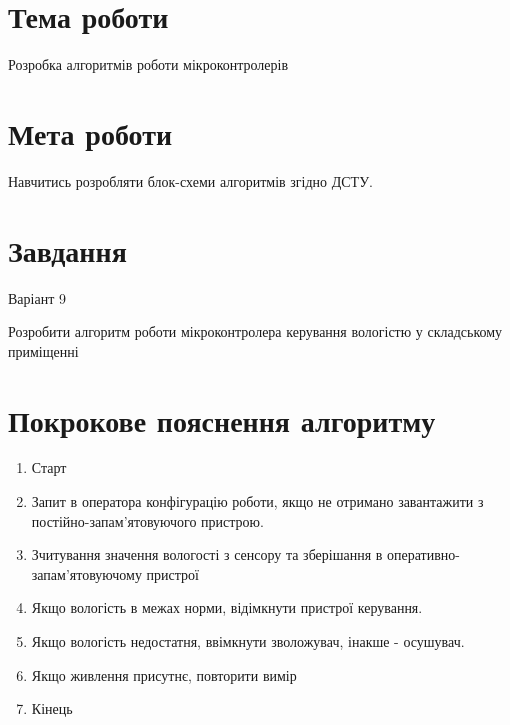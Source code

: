 \documentclass[a4paper]{article}
\begin{document}
\section*{Тема роботи}
Розробка алгоритмів роботи мікроконтролерів

\section*{Мета роботи}
Навчитись розробляти блок-схеми алгоритмів згідно ДСТУ.

\section*{Завдання}
Варіант 9

Розробити алгоритм роботи мікроконтролера керування вологістю у
складському приміщенні



\section*{Покрокове пояснення алгоритму}
\begin{enumerate}
    \item Старт
    \item Запит в оператора конфігурацію роботи, якщо не отримано завантажити з постійно-запам'ятовуючого пристрою.
    \item Зчитування значення вологості з сенсору та зберішання в оперативно-запам'ятовуючому пристрої
    \item Якщо вологість в межах норми, відімкнути пристрої керування.
    \item Якщо вологість недостатня, ввімкнути зволожувач, інакше - осушувач.
    \item Якщо живлення присутнє, повторити вимір
    \item Кінець
\end{enumerate}

\newpage
\end{document}

